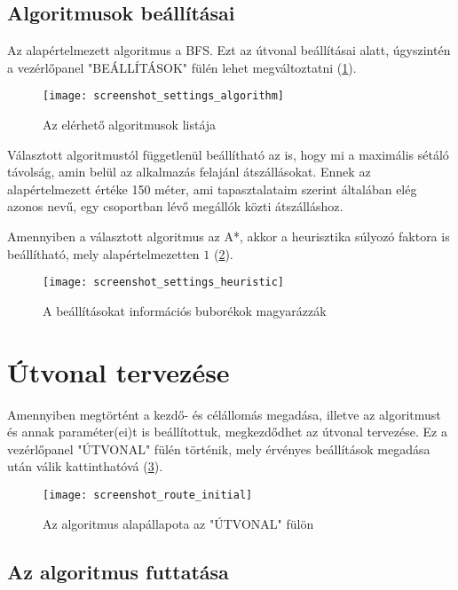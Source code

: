 \subsection{Algoritmusok beállításai}

Az alapértelmezett algoritmus a BFS. Ezt az útvonal beállításai alatt, úgyszintén a vezérlőpanel "BEÁLLÍTÁSOK" fülén lehet megváltoztatni (\ref{fig:screenshot-settings-algorithm}).

\begin{figure}[H]
	\centering
	\texttt{[image: screenshot\_settings\_algorithm]}
	\caption{Az elérhető algoritmusok listája}
	\label{fig:screenshot-settings-algorithm}
\end{figure}

Választott algoritmustól függetlenül beállítható az is, hogy mi a maximális sétáló távolság, amin belül az alkalmazás felajánl átszállásokat. Ennek az alapértelmezett értéke 150 méter, ami tapasztalataim szerint általában elég azonos nevű, egy csoportban lévő megállók közti átszálláshoz.

Amennyiben a választott algoritmus az A*, akkor a heurisztika súlyozó faktora is beállítható, mely alapértelmezetten $1$ (\ref{fig:screenshot-settings-heuristic}).

\begin{figure}[H]
	\centering
	\texttt{[image: screenshot\_settings\_heuristic]}
	\caption{A beállításokat információs buborékok magyarázzák}
	\label{fig:screenshot-settings-heuristic}
\end{figure}

\section{Útvonal tervezése}

Amennyiben megtörtént a kezdő- és célállomás megadása, illetve az algoritmust és annak paraméter(ei)t is beállítottuk, megkezdődhet az útvonal tervezése. Ez a vezérlőpanel "ÚTVONAL" fülén történik, mely érvényes beállítások megadása után válik kattinthatóvá (\ref{fig:screenshot-route-initial}).

\begin{figure}[H]
	\centering
	\texttt{[image: screenshot\_route\_initial]}
	\caption{Az algoritmus alapállapota az "ÚTVONAL" fülön}
	\label{fig:screenshot-route-initial}
\end{figure}

\subsection{Az algoritmus futtatása}

